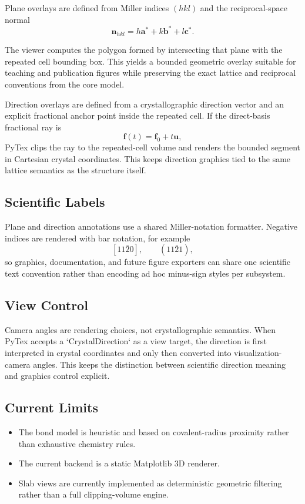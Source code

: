 Plane overlays are defined from Miller indices $(hkl)$ and the reciprocal-space normal
\[
\mathbf{n}_{hkl} = h \mathbf{a}^{*} + k \mathbf{b}^{*} + l \mathbf{c}^{*}.
\]

The viewer computes the polygon formed by intersecting that plane with the repeated cell bounding box. This yields a bounded geometric overlay suitable for teaching and publication figures while preserving the exact lattice and reciprocal conventions from the core model.

Direction overlays are defined from a crystallographic direction vector and an explicit fractional anchor point inside the repeated cell. If the direct-basis fractional ray is
\[
\mathbf{f}(t) = \mathbf{f}_0 + t\mathbf{u},
\]
PyTex clips the ray to the repeated-cell volume and renders the bounded segment in Cartesian crystal coordinates. This keeps direction graphics tied to the same lattice semantics as the structure itself.

\subsection{Scientific Labels}

Plane and direction annotations use a shared Miller-notation formatter. Negative indices are rendered with bar notation, for example
\[
[11\bar{2}0], \qquad (11\bar{2}1),
\]
so graphics, documentation, and future figure exporters can share one scientific text convention rather than encoding ad hoc minus-sign styles per subsystem.

\subsection{View Control}

Camera angles are rendering choices, not crystallographic semantics. When PyTex accepts a `CrystalDirection` as a view target, the direction is first interpreted in crystal coordinates and only then converted into visualization-camera angles. This keeps the distinction between scientific direction meaning and graphics control explicit.

\subsection{Current Limits}

\begin{itemize}
  \item The bond model is heuristic and based on covalent-radius proximity rather than exhaustive chemistry rules.
  \item The current backend is a static Matplotlib 3D renderer.
  \item Slab views are currently implemented as deterministic geometric filtering rather than a full clipping-volume engine.
\end{itemize}
